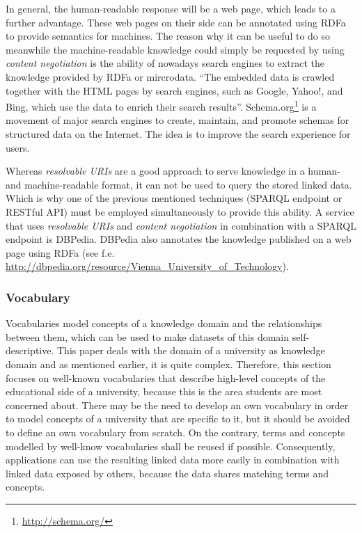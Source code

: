 \documentclass{article}
\begin{document}
In general, the human-readable response will be a web page, which leads to a further advantage. These web pages on their side can be annotated using RDFa to provide semantics for machines. The reason why it can be useful to do so meanwhile the machine-readable knowledge could simply be requested by using \textit{content negotiation} is the ability of nowadays search engines to extract the knowledge provided by RDFa or mircrodata. \enquote{The embedded data is crawled together with the HTML pages by search engines, such as Google, Yahoo!, and Bing, which use the data to enrich their search results}\cite{bizer_deployment_2013}. Schema.org\footnote{\url{http://schema.org/}} is a movement of major search engines to create, maintain, and promote schemas for structured data on the Internet. The idea is to improve the search experience for users.

Whereas \textit{resolvable URIs} are a good approach to serve knowledge in a human- and machine-readable format, it can not be used to query the stored linked data. Which is why one of the previous mentioned techniques (SPARQL endpoint or RESTful API) must be employed simultaneously to provide this ability. A service that uses \textit{resolvable URIs} and \textit{content negotiation} in combination with a SPARQL endpoint is DBPedia. DBPedia also annotates the knowledge published on a web page using RDFa (see f.e. \url{http://dbpedia.org/resource/Vienna_University_of_Technology}).

\subsubsection{Vocabulary}
\label{technical-architecture-challenges:proposal:vocabulary}
Vocabularies model concepts of a knowledge domain and the relationships between them, which can be used to make datasets of this domain self-descriptive. This paper deals with the domain of a university as knowledge domain and as mentioned earlier, it is quite complex. Therefore, this section focuses on well-known vocabularies that describe high-level concepts of the educational side of a university, because this is the area students are most concerned about. There may be the need to develop an own vocabulary in order to model concepts of a university that are specific to it, but it should be avoided to define an own vocabulary from scratch. On the contrary, terms and concepts modelled by well-know vocabularies shall be reused if possible. Consequently, applications can use the resulting linked data more easily in combination with linked data exposed by others, because the data shares matching terms and concepts.
\end{document}
